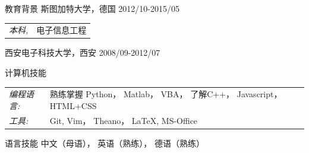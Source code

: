 \documentclass{resume} %
\begin{document}
\begin{CJK*}{UTF8}{gbsn}
\begin{rSection}{教育背景}
斯图加特大学，德国 \hfill 2012/10-2015/05 \\
\clearpage
\begin{tabular}{l l}
{\sl 本科,} & 电子信息工程\\
\end{tabular}

西安电子科技大学，西安 \hfill  2008/09-2012/07\\



\end{rSection}

\begin{rSection}{计算机技能}
\begin{tabular}{l l}
{\sl 编程语言:} &熟练掌握 Python， Matlab， VBA， 了解C++， Javascript， HTML+CSS\\
{\sl 工具:} &Git, Vim， Theano， \LaTeX{}, MS-Office
\end{tabular}

\end{rSection}

\begin{rSection}{语言技能}
中文（母语）， 英语（熟练）， 德语（熟练）
\end{rSection}




% 
% 


\end{CJK*}
\end{document}
